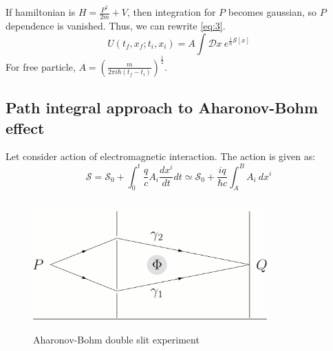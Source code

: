 \documentclass[%
 reprint,
 amsmath,amssymb,
 aps,
]{revtex4-1}
\begin{document}
If hamiltonian is \(H=\frac{P^2}{2m}+V\), then integration for $P$ becomes gaussian, so $P$ dependence is vanished. Thus, we can rewrite \eqref{eq:3}.
\begin{equation}\label{eq:5}
U(t_f,x_f;t_i,x_i)=A\int \mathcal{D}x\ e^{\frac{i}{\hbar}\mathcal{S}[x]}
\end{equation}
For free particle, \(A = (\frac{m}{2\pi i\hbar (t_f-t_i)})^{\frac{1}{2}}\).

\subsection{\label{sec:level2.2}Path integral approach to Aharonov-Bohm effect}

Let consider action of electromagnetic interaction. The action is given as:
\begin{equation}\label{eq:6}
\mathcal{S}=\mathcal{S}_0 + \int_{0}^{t} \frac{q}{c}A_i\frac{dx^i}{dt}dt \simeq \mathcal{S}_0 + \frac{iq}{\hbar c}\int_{A}^{B} A_i\ dx^i
\end{equation}
\begin{figure}
    \centering
    \includegraphics[width=9cm, height=5cm]{AB.png}
    \caption{Aharonov-Bohm double slit experiment}
    \label{fig:1}
\end{figure}
\end{document}

